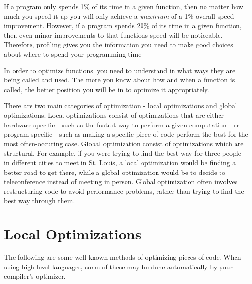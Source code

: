 If a program only spends 1\% of its time in a given function, then no matter 
how much you speed it up you will only achieve a 
\emph{maximum} of a 1\% overall speed improvement.
However, if a program spends 20\% of its time in a given function, then even
minor improvements to that functions speed will be noticeable.  Therefore,
profiling gives you the information you need to make good choices about
where to spend your programming time.

In order to optimize functions, you need to understand in what ways they
are being called and used.  The more you know about how and when a function
is called, the better position you will be in to optimize it appropriately.

There are two main categories of optimization - local optimizations and
global optimizations.  Local optimizations consist of optimizations that are
either hardware specific - such as the fastest way to perform a given
computation - or program-specific - such as making a specific piece of
code perform the best for the most often-occuring case.  Global optimization
consist of optimizations which are structural.  For example, if you were
trying to find the best way for three people in different cities to meet in
St. Louis, a local optimization would be finding a better road to get there,
while a global optimization would be to decide to teleconference instead of
meeting in person.  Global optimization often involves restructuring code
to avoid performance problems, rather than trying to find the best way 
through them.

\section{Local Optimizations}

The following are some well-known methods of optimizing pieces of code.  When
using high level languages, some of these may be done automatically by your
compiler's optimizer.

